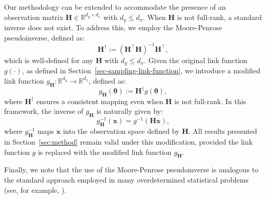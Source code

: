 Our methodology can be extended to accommodate the presence of an observation matrix $ \mathbf{H} \in \mathbb{R}^{d_y \times d_x} $ with $ d_y \leq d_x $. When $ \mathbf{H} $ is not full-rank, a standard inverse does not exist. To address this, we employ the Moore-Penrose pseudoinverse, defined as:
\begin{equation*}
\mathbf{H}^\dagger := (\mathbf{H}^\top \mathbf{H})^{-1} \mathbf{H}^\top,
\end{equation*}
which is well-defined for any $ \mathbf{H} $ with $ d_y \leq d_x $.  Given the original link function $ g(\cdot) $, as defined in Section~\ref{sec-sampling-link-function}, we introduce a modified link function $ g_{\mathbf{H}}: \mathbb{R}^{d_y} \to \mathbb{R}^{d_x} $, defined as:
\begin{equation*}
g_{\mathbf{H}}(\boldsymbol{\theta}) := \mathbf{H}^{\dagger} g(\boldsymbol{\theta}),
\end{equation*}
where $ \mathbf{H}^\dagger $ ensures a consistent mapping even when $ \mathbf{H} $ is not full-rank. In this framework, the inverse of $ g_{\mathbf{H}} $ is naturally given by:
\begin{equation*}
g_{\mathbf{H}}^{-1}(\mathbf{x}) = g^{-1}(\mathbf{H} \mathbf{x}),
\end{equation*}
where $ g_{\mathbf{H}}^{-1} $ maps $ \mathbf{x}$ into the observation space defined by $ \mathbf{H}$.
All results presented in Section~\ref{sec:method} remain valid under this modification, provided the link function $ g $ is replaced with the modified link function $ g_{\mathbf{H}} $.

Finally, we note that the use of the Moore-Penrose pseudoinverse is analogous to the standard approach employed in many overdetermined statistical problems (see, for example, \citet[Section 3.1.1]{bishop_pattern_recognition}).